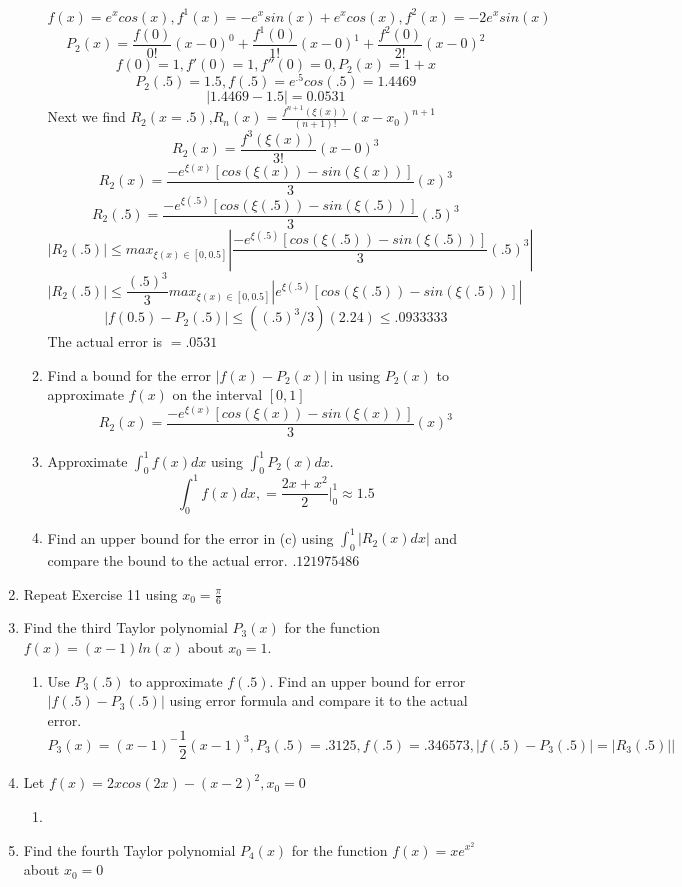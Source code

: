 \documentclass{article}
\begin{document}
\begin{enumerate}
\begin{enumerate}
        $$f(x) = e^{x}cos(x), f^{1}(x) = -e^{x}sin(x) + e^{x}cos(x),f^{2}(x) = -2e^{x}sin(x) $$
        $$P_2(x) =\frac{f(0)}{0!}(x-0)^0 +  \frac{f^{1}(0)}{1!}(x-0)^1 + \frac{f^{2}(0)}{2!}(x-0)^2$$
        $$f(0) = 1, f'(0) = 1, f''(0) = 0, P_2(x) = 1 + x$$
        $$P_2(.5) = 1.5, f(.5) = e^{.5}cos(.5) =1.4469 $$
        $$|1.4469 - 1.5| = 0.0531$$
        Next we find $R_2(x = .5)$,$R_n(x) = \frac{f^{n+1}(\xi(x))}{(n+1)!}(x-x_0)^{n+1}$
        $$R_2(x) = \frac{f^3(\xi(x))}{3!}(x-0)^3$$
        $$R_2(x) = \frac{-e^{\xi(x)}[cos(\xi(x)) - sin(\xi(x))]}{3}(x)^3$$
        $$R_2(.5) = \frac{-e^{\xi(.5)}[cos(\xi(.5)) - sin(\xi(.5))]}{3}(.5)^3$$
        $$|R_2(.5)| \leq max_{\xi(x)\in[0,0.5]}|\frac{-e^{\xi(.5)}[cos(\xi(.5)) - sin(\xi(.5))]}{3}(.5)^3|$$
        $$|R_2(.5)| \leq \frac{(.5)^3}{3} max_{\xi(x)\in[0,0.5]}|e^{\xi(.5)}[cos(\xi(.5)) - sin(\xi(.5))]|$$
        $$|f(0.5) - P_2(.5)| \leq ((.5)^3/3)(2.24) \leq .0933333$$
        The actual error is $= .0531$
        \item Find a bound for the error $|f(x) - P_2(x)|$ in using $P_2(x)$ to approximate $f(x)$ on the interval $[0,1]$
        $$R_2(x) = \frac{-e^{\xi(x)}[cos(\xi(x)) - sin(\xi(x))]}{3}(x)^3$$
        \item Approximate $\int_0^1f(x)dx$ using $\int_0^1 P_2(x)dx$.
        $$\int_0^1f(x)dx, = \frac{2x + x^2}{2}|_0^1 \approx 1.5$$
        \item Find an upper bound for the error in (c) using $\int_0^1|R_2(x)dx|$ and compare the bound to the actual error. $.121975486$
    \end{enumerate}
    \item Repeat Exercise 11 using $x_0 = \frac{\pi}{6}$
    \item Find the third Taylor polynomial $P_3(x)$ for the function $f(x) = (x-1)ln(x)$ about $x_0=1$.
    \begin{enumerate}
        \item Use $P_3(.5)$ to approximate $f(.5)$. Find an upper bound for error $|f(.5) - P_3(.5)|$ using error formula and compare it to the actual error.$$P_3(x) = (x-1)^-\frac{1}{2}(x-1)^3, P_3(.5) = .3125, f(.5) = .346573,|f(.5)-P_3(.5)|=|R_3(.5)||$$
    \end{enumerate}
    \item Let $f(x) = 2xcos(2x) - (x-2)^2, x_0 = 0$
    \begin{enumerate}
        \item 
    \end{enumerate}
    \item Find the fourth Taylor polynomial $P_4(x)$  for the function $f(x) = xe^{x^2}$ about $x_0 = 0$

\end{enumerate}
\end{document}

